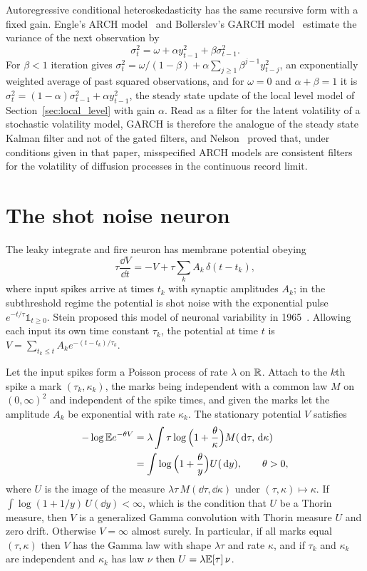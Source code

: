 Autoregressive conditional heteroskedasticity has the same recursive form with a fixed gain. Engle's ARCH model~\cite{engle1982} and Bollerslev's GARCH model~\cite{bollerslev1986} estimate the variance of the next observation by
\[
\sigma^2_t = \omega+\alpha y^2_{t-1}+\beta\sigma^2_{t-1}.
\]
For $\beta<1$ iteration gives $\sigma^2_t = \omega/(1-\beta)+\alpha\sum_{j\geq1}\beta^{j-1}y^2_{t-j}$, an exponentially weighted average of past squared observations, and for $\omega = 0$ and $\alpha+\beta = 1$ it is $\sigma^2_t = (1-\alpha)\sigma^2_{t-1}+\alpha y^2_{t-1}$, the steady state update of the local level model of Section~\ref{sec:local_level} with gain $\alpha$. Read as a filter for the latent volatility of a stochastic volatility model, GARCH is therefore the analogue of the steady state Kalman filter and not of the gated filters, and Nelson~\cite{nelson1992} proved that, under conditions given in that paper, misspecified ARCH models are consistent filters for the volatility of diffusion processes in the continuous record limit.

\section{The shot noise neuron}

The leaky integrate and fire neuron has membrane potential obeying
\[
\tau\frac{\dd V}{\dd t} = -V+\tau\sum_kA_k\,\delta(t-t_k),
\]
where input spikes arrive at times $t_k$ with synaptic amplitudes $A_k$; in the subthreshold regime the potential is shot noise with the exponential pulse $e^{-t/\tau}\mathbb{1}_{t\geq0}$. Stein proposed this model of neuronal variability in 1965~\cite{stein1965}. Allowing each input its own time constant $\tau_k$, the potential at time $t$ is $V = \sum_{t_k\leq t}A_ke^{-(t-t_k)/\tau_k}$.

\begin{theorem}
\label{thm:shot_noise_neuron}
Let the input spikes form a Poisson process of rate $\lambda$ on $\mathbb{R}$. Attach to the $k$th spike a mark $(\tau_k,\kappa_k)$, the marks being independent with a common law $M$ on $(0,\infty)^2$ and independent of the spike times, and given the marks let the amplitude $A_k$ be exponential with rate $\kappa_k$. The stationary potential $V$ satisfies
\[
\begin{aligned}-\log\mathbb{E} e^{-\theta V} &= \lambda\int\tau\log\Big(1+\frac\theta\kappa\Big)M(\,\mathrm{d}\tau,\,\mathrm{d}\kappa)\\ &= \int\log\Big(1+\frac\theta y\Big)U(\,\mathrm{d} y),\qquad\theta>0,\end{aligned}
\]
where $U$ is the image of the measure $\lambda\tau\,M(\dd\tau,\dd\kappa)$ under $(\tau,\kappa)\mapsto\kappa$. If $\int\log(1+1/y)\,U(\dd y)<\infty$, which is the condition that $U$ be a Thorin measure, then $V$ is a generalized Gamma convolution with Thorin measure $U$ and zero drift. Otherwise $V = \infty$ almost surely. In particular, if all marks equal $(\tau,\kappa)$ then $V$ has the Gamma law with shape $\lambda\tau$ and rate $\kappa$, and if $\tau_k$ and $\kappa_k$ are independent and $\kappa_k$ has law $\nu$ then $U = \lambda\mathbb{E}[\tau]\,\nu$.
\end{theorem}


